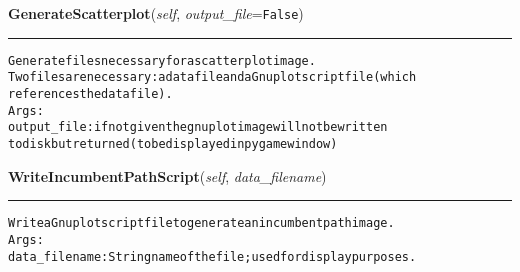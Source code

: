     \label{coinor:grumpy:BB:BBTree:GenerateScatterplot}

    \vspace{0.5ex}

\hspace{.8\funcindent}\begin{boxedminipage}{\funcwidth}

    \raggedright \textbf{GenerateScatterplot}(\textit{self}, \textit{output\_file}={\tt False})

    \vspace{-1.5ex}

    \rule{\textwidth}{0.5\fboxrule}
\setlength{\parskip}{2ex}
\begin{alltt}

Generate files necessary for a scatterplot image.
Two files are necessary: a data file and a Gnuplot script file (which
references the data file).
Args:
    output\_file: if not given the gnuplot image will not be written
to disk but returned (to be displayed in pygame window)
\end{alltt}

\setlength{\parskip}{1ex}
    \end{boxedminipage}

    \label{coinor:grumpy:BB:BBTree:WriteIncumbentPathScript}

    \vspace{0.5ex}

\hspace{.8\funcindent}\begin{boxedminipage}{\funcwidth}

    \raggedright \textbf{WriteIncumbentPathScript}(\textit{self}, \textit{data\_filename})

    \vspace{-1.5ex}

    \rule{\textwidth}{0.5\fboxrule}
\setlength{\parskip}{2ex}
\begin{alltt}

Write a Gnuplot script file to generate an incumbent path image.
Args:
  data\_filename: String name of the file; used for display purposes.
\end{alltt}

\setlength{\parskip}{1ex}
    \end{boxedminipage}

